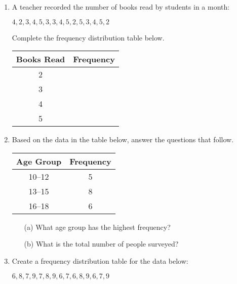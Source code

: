 \begin{enumerate}[noitemsep, label = \color{blue}\arabic*.]
    \item A teacher recorded the number of books read by students in a month: 

      {\centering $  4, 2, 3, 4, 5, 3, 3, 4, 5, 2, 5, 3, 4, 5, 2  $\par}
      
    Complete the frequency distribution table below.

    \begin{center}
    \begin{tabular}{|c|c|}
    \hline
    \textbf{Books Read} & \textbf{Frequency} \\
    \hline
    2 & \\
    \hline
    3 & \\
    \hline
    4 & \\
    \hline
    5 & \\
    \hline
    \end{tabular}
    \end{center}

\nextcolumn
    
    \item Based on the data in the table below, answer the questions that follow.

    \begin{center}
    \begin{tabular}{|c|c|}
    \hline
    \textbf{Age Group} & \textbf{Frequency} \\
    \hline
    10--12 & 5 \\
    \hline
    13--15 & 8 \\
    \hline
    16--18 & 6 \\
    \hline
    \end{tabular}
    \end{center}

    \begin{itemize}
        \item[(a)] What age group has the highest frequency?
        \item[(b)] What is the total number of people surveyed?
    \end{itemize}

    \item Create a frequency distribution table for the data below:

    {\centering $  6, 8, 7, 9, 7, 8, 9, 6, 7, 6, 8, 9, 6, 7, 9  $\par}
    
\end{enumerate}
